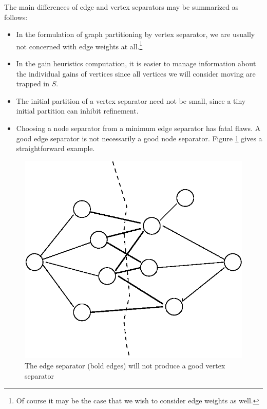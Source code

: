\documentclass[a4paper,12pt]{article}
\begin{document}
The main differences of edge and vertex separators may be
summarized as follows:
\begin{itemize}
\item In the formulation of graph partitioning by vertex separator, we
are usually not concerned with edge weights at all.\footnote{Of course
it may be the case that we wish to consider edge weights as well.}
\item In the gain heuristics computation, it is easier to manage
information about the individual gains of vertices since all vertices
we will consider moving are trapped in $S$.
\item The initial partition of a vertex separator need not be small,
since a tiny initial partition can inhibit refinement.\cite{gupta1}
\item Choosing a node separator from a minimum edge separator
has fatal flaws. A good edge separator is not necessarily a good node
separator. Figure \ref{fig:2} gives a straightforward example.
\end{itemize}

\begin{figure}
\begin{center}
\includegraphics{edgesep_nodesep.eps}
\caption{The edge separator (bold edges) will not produce a good vertex separator}
\label{fig:2}
\end{center}
\end{figure}
\end{document}
